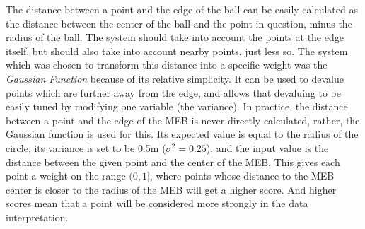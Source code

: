 The distance between a point and the edge of the ball can be easily calculated as the distance between the center of the ball and the point in question, minus the radius of the ball.
The system should take into account the points at the edge itself, but should also take into account nearby points, just less so.
The system which was chosen to transform this distance into a specific weight was the \textit{Gaussian Function} because of its relative simplicity.
It can be used to devalue points which are further away from the edge, and allows that devaluing to be easily tuned by modifying one variable (the variance).
In practice, the distance between a point and the edge of the MEB is never directly calculated, rather, the Gaussian function is used for this.
Its expected value is equal to the radius of the circle, its variance is set to be 0.5m ($\sigma^2 = 0.25$), and the input value is the distance between the given point and the center of the MEB.
This gives each point a weight on the range $(0, 1]$, where points whose distance to the MEB center is closer to the radius of the MEB will get a higher score.
And higher scores mean that a point will be considered more strongly in the data interpretation.












